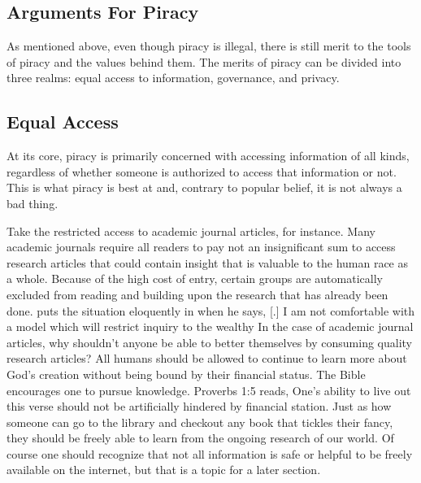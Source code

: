 \documentclass[onecolumn, 12pt]{article}
\begin{document}
\begin{refsection}
\section{Arguments For Piracy}
As mentioned above, even though piracy is illegal, there is still merit to the tools of
piracy and the values behind them. The merits of piracy can be divided into three realms:
equal access to information, governance, and privacy.

\subsection{Equal Access}
At its core, piracy is primarily concerned with accessing information of all kinds,
regardless of whether someone is authorized to access that information or not. This is
what piracy is best at and, contrary to popular belief, it is not always a bad thing.

Take the restricted access to academic journal articles, for instance. Many academic
journals require all readers to pay not an insignificant sum to access research articles
that could contain insight that is valuable to the human race as a whole. Because of the
high cost of entry, certain groups are automatically excluded from reading and building
upon the research that has already been done. \citeauthor{barlow:wine} puts the situation
eloquently in  when he says, [.]{%
  I am not comfortable with a model which will restrict inquiry to the wealthy%
}
In the case of academic journal articles, why shouldn't anyone be able to better
themselves by consuming quality research articles? All humans should be allowed to
continue to learn more about God's creation without being bound by their financial status.
The Bible encourages one to pursue knowledge. Proverbs 1:5 reads,
One's ability to live out this verse should not be artificially hindered by financial
station. Just as how someone can go to the library and checkout any book that tickles
their fancy, they should be freely able to learn from the ongoing research of our world.
Of course one should recognize that not all information is safe or helpful to be freely
available on the internet, but that is a topic for a later section.


\end{refsection}
\end{document}
